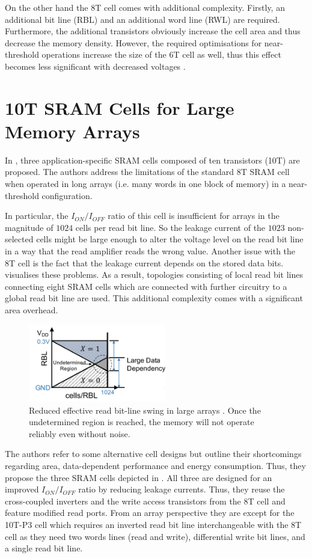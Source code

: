 \documentclass[conference]{IEEEtran}
\begin{document}
On the other hand the 8T cell comes with additional complexity. Firstly, an additional bit line (RBL) and an additional word line (RWL) are required. Furthermore, the additional transistors obviously increase the cell area and thus decrease the memory density. However, the required optimisations for near-threshold operations increase the size of the 6T cell as well, thus this effect becomes less significant with decreased voltages \cite{Dreslinski2010}.

\section{10T SRAM Cells for Large Memory Arrays} \label{sec:paper1}

In \cite{Gupta2019}, three application-specific SRAM cells composed of ten transistors (10T) are proposed. The authors address the limitations of the standard 8T SRAM cell when operated in long arrays (i.e. many words in one block of memory) in a near-threshold configuration.

In particular, the $I_{ON}/I_{OFF}$ ratio of this cell is insufficient for arrays in the magnitude of $1024$ cells per read bit line. So the leakage current of the $1023$ non-selected cells might be large enough to alter the voltage level on the read bit line in a way that the read amplifier reads the wrong value. Another issue with the 8T cell is the fact that the leakage current depends on the stored data bits.  visualises these problems. As a result, topologies consisting of local read bit lines connecting eight SRAM cells which are connected with further circuitry to a global read bit line are used. This additional complexity comes with a significant area overhead.

\begin{figure}
	\centering
	\includegraphics[width=6cm]{leakage.png}
	\caption{Reduced effective read bit-line swing in large arrays \cite{Gupta2019}. Once the undetermined region is reached, the memory will not operate reliably even without noise.}
	\label{fig:leakage}
\end{figure}

The authors refer to some alternative cell designs \cite{Calhoun2007, Kim2008, Pasandi2015} but outline their shortcomings regarding area, data-dependent performance and energy consumption. Thus, they propose the three SRAM cells depicted in . All three are designed for an improved $I_{ON}/I_{OFF}$ ratio by reducing leakage currents. Thus, they reuse the cross-coupled inverters and the write access transistors from the 8T cell and feature modified read ports. From an array perspective they are except for the 10T-P3 cell which requires an inverted read bit line interchangeable with the 8T cell as they need two words lines (read and write), differential write bit lines, and a single read bit line.
\end{document}

